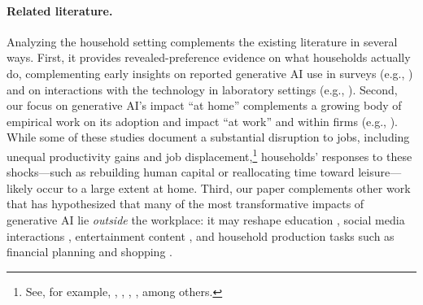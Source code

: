 \documentclass[12pt]{article}
\begin{document}

\paragraph{Related literature.} Analyzing the household setting complements the existing literature in several ways. First, it provides revealed-preference evidence on what households actually do, complementing early insights on reported generative AI use in surveys (e.g., \cite{bick2024}) and on interactions with the technology in laboratory settings (e.g., \cite{kosmyna2025your}). Second, our focus on generative AI's impact ``at home'' complements a growing body of empirical work on its adoption and impact ``at work'' and within firms (e.g., \cite{brynjolfsson2023, schubert2025organizational, yotzov_firm_2026}). While some of these studies document a substantial disruption to jobs, including unequal productivity gains and job displacement,\footnote{See, for example, \cite{eisfeldt2023}, \cite{eisfeldt2024}, \cite{humlum2025}, \cite{chatterji_how_2025}, among others.} 
households' responses to these shocks—such as rebuilding human capital or reallocating time toward leisure—likely occur to a large extent at home. Third, our paper complements other work that has hypothesized that many of the most transformative impacts of generative AI lie \textit{outside} the workplace: it may reshape education \citep{khan2024}, social media interactions \citep{ghani2022}, entertainment content \citep{zhang2025}, and household production tasks such as financial planning \citep{lo2024} and shopping \citep{lei2025}.
\end{document}
